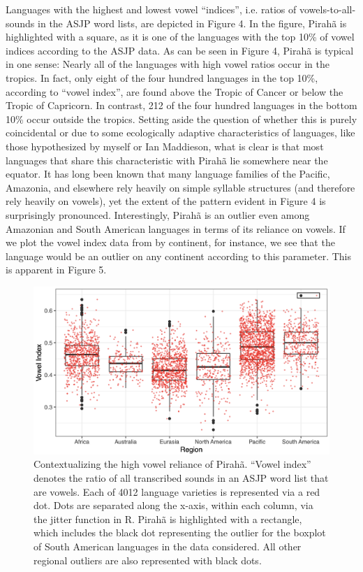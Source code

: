 \documentclass[output=paper,colorlinks,citecolor=brown
]{langscibook}
\begin{document}
    Languages with the highest and lowest vowel “indices”, i.e. ratios of vowels-to-all-sounds in the ASJP word lists, are depicted in Figure 4. In the figure, Pirahã is highlighted with a square, as it is one of the languages with the top 10\% of vowel indices according to the ASJP data. As can be seen in Figure 4, Pirahã is typical in one sense: Nearly all of the languages with high vowel ratios occur in the tropics. In fact, only eight of the four hundred languages in the top 10\%, according to “vowel index”, are found above the Tropic of Cancer or below the Tropic of Capricorn. In contrast, 212 of the four hundred languages in the bottom 10\% occur outside the tropics. Setting aside the question of whether this is purely coincidental or due to some ecologically adaptive characteristics of languages, like those hypothesized by myself or Ian Maddieson, what is clear is that most languages that share this characteristic with Pirahã lie somewhere near the equator. It has long been known that many language families of the Pacific, Amazonia, and elsewhere rely heavily on simple syllable structures (and therefore rely heavily on vowels), yet the extent of the pattern evident in Figure 4 is surprisingly pronounced. Interestingly, Pirahã is an outlier even among Amazonian and South American languages in terms of its reliance on vowels. If we plot the vowel index data from  by continent, for instance, we see that the language would be an outlier on any continent according to this parameter. This is apparent in Figure 5.

\begin{figure}
\centering
\includegraphics[width=1\textwidth]{everett_figure5.png}
\caption{\label{fig:Figure 5}Contextualizing the high vowel reliance of Pirahã. “Vowel index” denotes the ratio of all transcribed sounds in an ASJP word list that are vowels. Each of 4012 language varieties is represented via a red dot. Dots are separated along the x-axis, within each column, via the jitter function in R. Pirahã is highlighted with a rectangle, which includes the black dot representing the outlier for the boxplot of South American languages in the data considered. All other regional outliers are also represented with black dots.
}

\end{figure}
\end{document}

